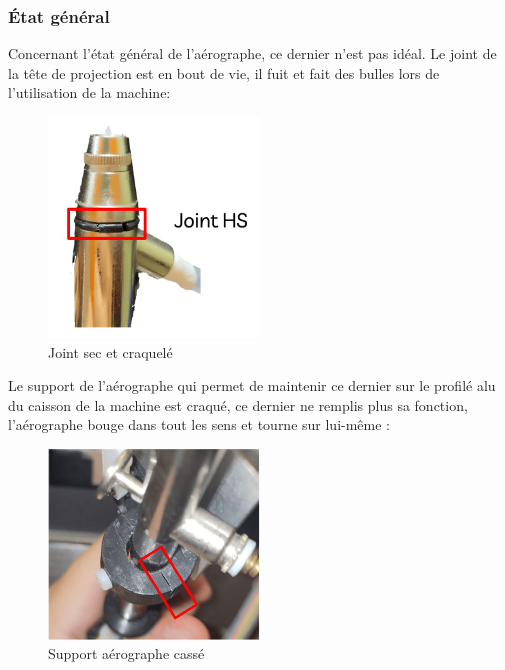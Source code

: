 \newpage
\subsubsection{État général}
Concernant l'état général de l'aérographe, ce dernier n'est pas idéal.
Le joint de la tête de projection est en bout de vie, il fuit et fait des bulles lors de l'utilisation de la machine:
\begin{figure}[H]
  \centering
  \includegraphics[width = 0.5\textwidth]{assets/figures/situation_initiale/joint_aerographe_HS.png}
  \caption{Joint sec et craquelé}
\end{figure}

Le support de l'aérographe qui permet de maintenir ce dernier sur le profilé alu du caisson de la machine est craqué,
ce dernier ne remplis plus sa fonction, l'aérographe bouge dans tout les sens et tourne sur lui-même :
\begin{figure}[H]
  \centering
  \includegraphics[width = 0.5\textwidth]{assets/figures/situation_initiale/support_aerographe_casse.png}
  \caption{Support aérographe cassé}
\end{figure}